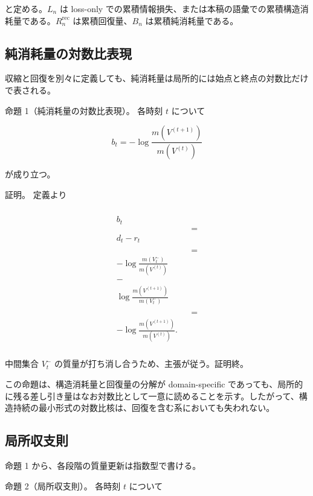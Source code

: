 \documentclass[12pt,a4paper]{article}
\begin{document}
と定める。\(L_{n}\) は loss-only での累積情報損失、または本稿の語彙での累積構造消耗量である。\(R_{n}^{\mathrm{rec}}\) は累積回復量、\(B_{n}\) は累積純消耗量である。

\subsection{純消耗量の対数比表現}\label{ux7d14ux6d88ux8017ux91cfux306eux5bfeux6570ux6bd4ux8868ux73fe}

収縮と回復を別々に定義しても、純消耗量は局所的には始点と終点の対数比だけで表される。

命題 1（純消耗量の対数比表現）。 各時刻 \(t\) について

\[
b_{t} = -\log \frac{m(V^{(t+1)})}{m(V^{(t)})}
\]

が成り立つ。

証明。 定義より

\[
\begin{aligned}
\begin{aligned} \\
b_{t} \\
&&= \\
d_{t} - r_{t} \\ \\
&&= \\
-\log \frac{m(V_{t}^-)}{m(V^{(t)})} \\
- \\
\log \frac{m(V^{(t+1)})}{m(V_{t}^-)} \\ \\
&&= \\
-\log \frac{m(V^{(t+1)})}{m(V^{(t)})}. \\
\end{aligned}
\end{aligned}
\]

中間集合 \(V_{t}^-\) の質量が打ち消し合うため、主張が従う。証明終。

この命題は、構造消耗量と回復量の分解が domain-specific であっても、局所的に残る差し引き量はなお対数比として一意に読めることを示す。したがって、構造持続の最小形式の対数比核は、回復を含む系においても失われない。

\subsection{局所収支則}\label{ux5c40ux6240ux53ceux652fux5247}

命題 1 から、各段階の質量更新は指数型で書ける。

命題 2（局所収支則）。 各時刻 \(t\) について
\end{document}
